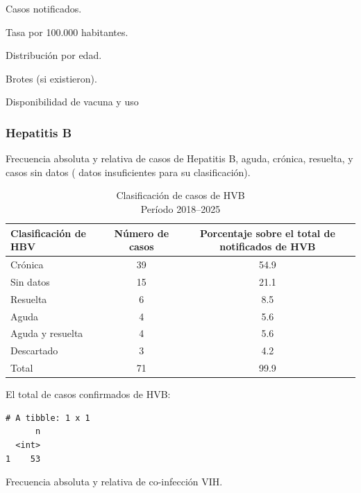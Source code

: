 \documentclass[
  letterpaper,
  DIV=11,
  numbers=noendperiod]{scrartcl}
\begin{document}
Casos notificados.

Tasa por 100.000 habitantes.

Distribución por edad.

Brotes (si existieron).

Disponibilidad de vacuna y uso

\hypertarget{hepatitis-b}{%
\subsubsection{\texorpdfstring{\textbf{Hepatitis
B}}{Hepatitis B}}\label{hepatitis-b}}

Frecuencia absoluta y relativa de casos de Hepatitis B, aguda, crónica,
resuelta, y casos sin datos ( datos insuficientes para su
clasificación).

\begin{table}
\caption*{
{\fontsize{20}{25}\selectfont  Clasificación de casos de HVB\fontsize{12}{15}\selectfont } \\ 
{\fontsize{14}{17}\selectfont  Período 2018–2025\fontsize{12}{15}\selectfont }
} 
\fontsize{12.0pt}{14.0pt}\selectfont
\begin{tabular*}{\linewidth}{@{\extracolsep{\fill}}lcc}
\toprule
Clasificación de HBV  & Número de casos & Porcentaje sobre el total de notificados de HVB \\ 
\midrule\addlinespace[2.5pt]
Crónica & 39 & 54.9 \\ 
Sin datos & 15 & 21.1 \\ 
Resuelta & 6 & 8.5 \\ 
Aguda & 4 & 5.6 \\ 
Aguda y resuelta & 4 & 5.6 \\ 
Descartado & 3 & 4.2 \\ 
Total & 71 & 99.9 \\ 
\bottomrule
\end{tabular*}
\end{table}

El total de casos confirmados de HVB:

\begin{verbatim}
# A tibble: 1 x 1
      n
  <int>
1    53
\end{verbatim}

Frecuencia absoluta y relativa de co-infección VIH.
\end{document}
